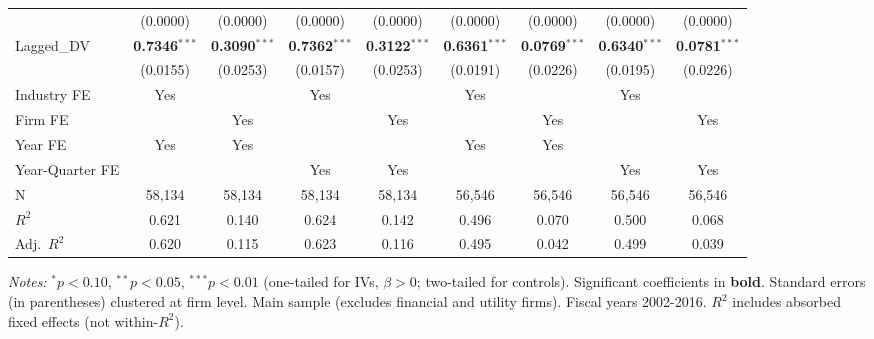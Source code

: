 \documentclass[11pt,a4paper]{article}
\begin{document}
\begin{table}[htbp]
\begin{tabular}{lcccccccc}
 & (0.0000) & (0.0000) & (0.0000) & (0.0000) & (0.0000) & (0.0000) & (0.0000) & (0.0000) \\
Lagged\_DV & \textbf{0.7346}$^{***}$ & \textbf{0.3090}$^{***}$ & \textbf{0.7362}$^{***}$ & \textbf{0.3122}$^{***}$ & \textbf{0.6361}$^{***}$ & \textbf{0.0769}$^{***}$ & \textbf{0.6340}$^{***}$ & \textbf{0.0781}$^{***}$ \\
 & (0.0155) & (0.0253) & (0.0157) & (0.0253) & (0.0191) & (0.0226) & (0.0195) & (0.0226) \\
\midrule
Industry FE & Yes &  & Yes &  & Yes &  & Yes &  \\
Firm FE &  & Yes &  & Yes &  & Yes &  & Yes \\
Year FE & Yes & Yes &  &  & Yes & Yes &  &  \\
Year-Quarter FE &  &  & Yes & Yes &  &  & Yes & Yes \\
\midrule
N & 58,134 & 58,134 & 58,134 & 58,134 & 56,546 & 56,546 & 56,546 & 56,546 \\
$R^2$ & 0.621 & 0.140 & 0.624 & 0.142 & 0.496 & 0.070 & 0.500 & 0.068 \\
Adj.~$R^2$ & 0.620 & 0.115 & 0.623 & 0.116 & 0.495 & 0.042 & 0.499 & 0.039 \\
\bottomrule
\end{tabular}
\begin{minipage}{\linewidth}
\vspace{2pt}\scriptsize
\textit{Notes:} $^{*}p<0.10$, $^{**}p<0.05$, $^{***}p<0.01$ (one-tailed for IVs, $\beta > 0$; two-tailed for controls).
 Significant coefficients in \textbf{bold}.
 Standard errors (in parentheses) clustered at firm level.
 Main sample (excludes financial and utility firms). Fiscal years 2002-2016.
 $R^2$ includes absorbed fixed effects (not within-$R^2$).
\end{minipage}
\end{table}
\clearpage
\end{document}
